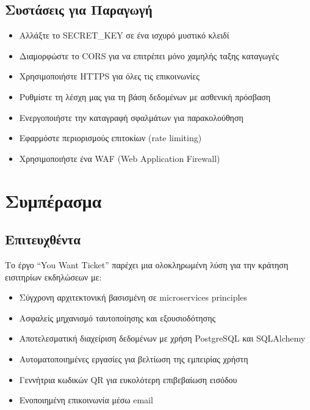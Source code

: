 \documentclass[12pt,a4paper]{report}
\begin{document}
\section{Συστάσεις για Παραγωγή}

\begin{itemize}
    \item Αλλάξτε το SECRET\_KEY σε ένα ισχυρό μυστικό κλειδί
    \item Διαμορφώστε το CORS για να επιτρέπει μόνο χαμηλής ταξης καταγωγές
    \item Χρησιμοποιήστε HTTPS για όλες τις επικοινωνίες
    \item Ρυθμίστε τη λέσχη μας για τη βάση δεδομένων με ασθενική πρόσβαση
    \item Ενεργοποιήστε την καταγραφή σφαλμάτων για παρακολούθηση
    \item Εφαρμόστε περιορισμούς επιτοκίων (rate limiting)
    \item Χρησιμοποιήστε ένα WAF (Web Application Firewall)
\end{itemize}

\newpage

\chapter{Συμπέρασμα}

\section{Επιτευχθέντα}

Το έργο ``You Want Ticket'' παρέχει μια ολοκληρωμένη λύση για την κράτηση εισιτηρίων εκδηλώσεων με:

\begin{itemize}
    \item Σύγχρονη αρχιτεκτονική βασισμένη σε microservices principles
    \item Ασφαλείς μηχανισμό ταυτοποίησης και εξουσιοδότησης
    \item Αποτελεσματική διαχείριση δεδομένων με χρήση PostgreSQL και SQLAlchemy
    \item Αυτοματοποιημένες εργασίες για βελτίωση της εμπειρίας χρήστη
    \item Γεννήτρια κωδικών QR για ευκολότερη επιβεβαίωση εισόδου
    \item Ενοποιημένη επικοινωνία μέσω email
\end{itemize}
\end{document}
